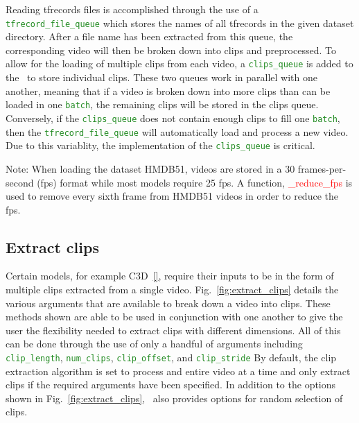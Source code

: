 \documentclass{llncs}
\begin{document}
Reading tfrecords files is accomplished through the use of a \texttt{\textcolor{ForestGreen}{tfrecord\_file\_queue}} which stores the names of all tfrecords in the given dataset directory.
After a file name has been extracted from this queue, the corresponding video will then be broken down into clips and preprocessed.
To allow for the loading of multiple clips from each video, a \texttt{\textcolor{ForestGreen}{clips\_queue}} is added to the \data~to store individual clips.
These two queues work in parallel with one another, meaning that if a video is broken down into more clips than can be loaded in one \texttt{\textcolor{ForestGreen}{batch}}, the remaining clips will be stored in the clips queue.
Conversely, if the \texttt{\textcolor{ForestGreen}{clips\_queue}} does not contain enough clips to fill one \texttt{\textcolor{ForestGreen}{batch}}, then the \texttt{\textcolor{ForestGreen}{tfrecord\_file\_queue}} will automatically load and process a new video.
Due to this variablity, the implementation of the \texttt{\textcolor{ForestGreen}{clips\_queue}} is critical.

Note: When loading the dataset HMDB51, videos are stored in a 30 frames-per-second (fps) format while most models require 25 fps. A function, \textcolor{red}{\_reduce\_fps} is used to remove every sixth frame from HMDB51 videos in order to reduce the fps.


\subsection{Extract clips}
\label{sec:extractclips}
Certain models, for example C3D~\ref{}, require their inputs to be in the form of multiple clips extracted from a single video.
Fig.~\ref{fig:extract_clips} details the various arguments that are available to break down a video into clips.
These methods shown are able to be used in conjunction with one another to give the user the flexibility needed to extract clips with different dimensions.
All of this can be done through the use of only a handful of arguments including \texttt{\textcolor{ForestGreen}{clip\_length}}, \texttt{\textcolor{ForestGreen}{num\_clips}}, \texttt{\textcolor{ForestGreen}{clip\_offset}}, and \texttt{\textcolor{ForestGreen}{clip\_stride}}
By default, the clip extraction algorithm is set to process and entire video at a time and only extract clips if the required arguments have been specified.
In addition to the options shown in Fig.~\ref{fig:extract_clips}, \acro~also provides options for random selection of clips.
\end{document}
